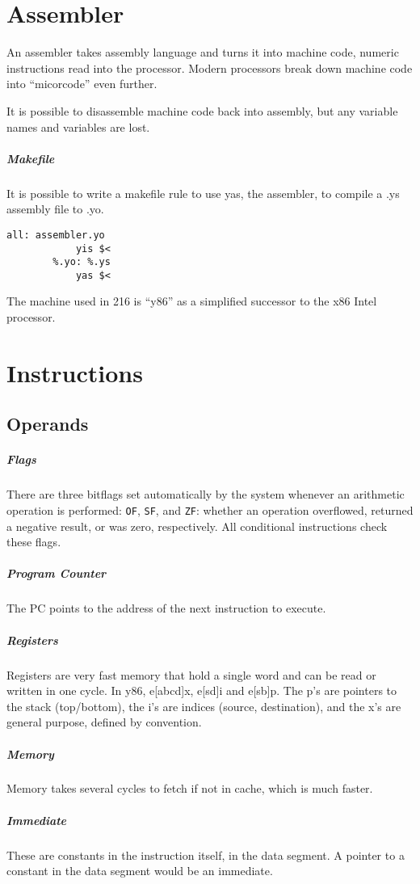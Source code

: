 \documentclass[11pt]{article}
\begin{document}
\section{Assembler}
	An assembler takes assembly language and turns it into machine code, numeric
	instructions read into the processor. Modern processors break down machine
	code into ``micorcode'' even further.

	It is possible to disassemble machine code back into assembly, but any
	variable names and variables are lost.

	\subparagraph{Makefile} It is possible to write a makefile rule to use yas,
	the assembler, to compile a .ys assembly file to .yo.

	\begin{lstlisting}[autogobble=true]
		all: assembler.yo
			yis $<
		%.yo: %.ys
			yas $<
	\end{lstlisting}

	The machine used in 216 is ``y86'' as a simplified successor to the x86
	Intel processor.

\section{Instructions}
	\subsection{Operands}
		\subparagraph{Flags} There are three bitflags set automatically by the system
		whenever an arithmetic operation is performed: \verb|OF|, \verb|SF|, and
		\verb|ZF|: whether an operation overflowed, returned a negative result, or
		was zero, respectively. All conditional instructions check these flags.

		\subparagraph{Program Counter} The PC points to the address of the next
		instruction to execute.

		\subparagraph{Registers} Registers are very fast memory that hold a single
		word and  can be read or written in one cycle. In y86, e[abcd]x, e[sd]i and e[sb]p. The p's are
		pointers to the stack (top/bottom), the i's are indices (source, destination), and the
		x's are general purpose, defined by convention.

		\subparagraph{Memory} Memory takes several cycles to fetch if not in cache, which is
		much faster.

		\subparagraph{Immediate} These are constants in the instruction itself, in
		the data segment. A pointer to a constant in the data segment would be an
		immediate.
\end{document}
